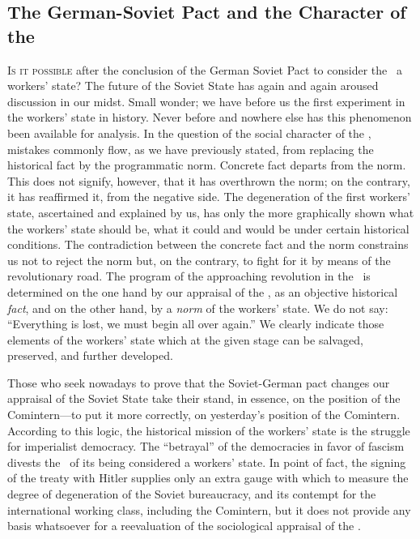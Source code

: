 
\subsection*{The German-Soviet Pact and the Character of the \USSR}

\textsc{Is it possible} after the conclusion of the German Soviet Pact to consider the \USSR\ a workers’ state? The future of the Soviet State has again and again aroused discussion in our midst. Small wonder; we have before us the first experiment in the workers’ state in history. Never before and nowhere else has this phenomenon been available for analysis. In the question of the social character of the \USSR, mistakes commonly flow, as we have previously stated, from replacing the historical fact by the programmatic norm. Concrete fact departs from the norm. This does not signify, however, that it has overthrown the norm; on the contrary, it has reaffirmed it, from the negative side. The degeneration of the first workers’ state, ascertained and explained by us, has only the more graphically shown what the workers’ state should be, what it could and would be under certain historical conditions. The contradiction between the concrete fact and the norm constrains us not to reject the norm but, on the contrary, to fight for it by means of the revolutionary road. The program of the approaching revolution in the \USSR\ is determined on the one hand by our appraisal of the \USSR, as an objective historical \emph{fact}, and on the other hand, by a \emph{norm} of the workers’ state. We do not say: “Everything is lost, we must begin all over again.” We clearly indicate those elements of the workers’ state which at the given stage can be salvaged, preserved, and further developed.

Those who seek nowadays to prove that the Soviet-German pact chan\-ges our appraisal of the Soviet State take their stand, in essence, on the position of the Comintern---to put it more correctly, on yesterday’s position of the Comintern. According to this logic, the historical mission of the workers’ state is the struggle for imperialist democracy. The “betrayal” of the democracies in favor of fascism divests the \USSR\ of its being considered a workers’ state. In point of fact, the signing of the treaty with Hitler supplies only an extra gauge with which to measure the degree of degeneration of the Soviet bureaucracy, and its contempt for the international working class, including the Comintern, but it does not provide any basis whatsoever for a reevaluation of the sociological appraisal of the \USSR.


